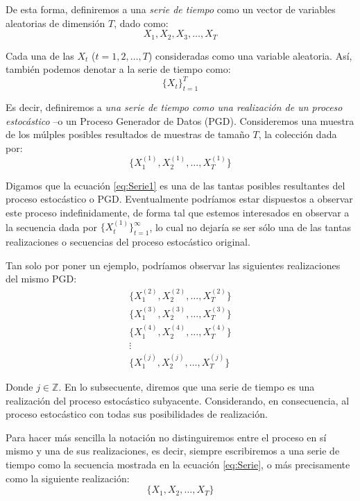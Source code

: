 \documentclass[
]{book}
\begin{document}
De esta forma, definiremos a una \emph{serie de tiempo} como un vector de variables aleatorias de dimensión \(T\), dado como:
\begin{equation}
    X_1, X_2, X_3, \ldots ,X_T
    \label{eq:Serie0}
\end{equation}

Cada una de las \(X_t\) (\(t = 1, 2, \ldots, T\)) consideradas como una variable aleatoria. Así, también podemos denotar a la serie de tiempo como:
\begin{equation}
    \{ X_t \}^T_{t = 1}
    \label{eq:Serie}
\end{equation}

Es decir, definiremos a \emph{una serie de tiempo como una realización de un proceso estocástico} --o un Proceso Generador de Datos (PGD). Consideremos una muestra de los múlples posibles resultados de muestras de tamaño \(T\), la colección dada por:
\begin{equation}
    \{X^{(1)}_1, X^{(1)}_2, \ldots, X^{(1)}_T\}
    \label{eq:Serie1}
\end{equation}

Digamos que la ecuación \eqref{eq:Serie1} es una de las tantas posibles resultantes del proceso estocástico o PGD. Eventualmente podríamos estar dispuestos a observar este proceso indefinidamente, de forma tal que estemos interesados en observar a la secuencia dada por \(\{ X^{(1)}_t \}^{\infty}_{t = 1}\), lo cual no dejaría se ser sólo una de las tantas realizaciones o secuencias del proceso estocástico original.

Tan solo por poner un ejemplo, podríamos observar las siguientes realizaciones del mismo PGD:
\begin{eqnarray*}
    & \{X^{(2)}_1, X^{(2)}_2, \ldots, X^{(2)}_T\} & \\
    & \{X^{(3)}_1, X^{(3)}_2, \ldots, X^{(3)}_T\} & \\
    & \{X^{(4)}_1, X^{(4)}_2, \ldots, X^{(4)}_T\} & \\
    & \vdots & \\
    & \{X^{(j)}_1, X^{(j)}_2, \ldots, X^{(j)}_T\} & 
\end{eqnarray*}

Donde \(j \in \mathbb{Z}\). En lo subsecuente, diremos que una serie de tiempo es una realización del proceso estocástico subyacente. Considerando, en consecuencia, al proceso estocástico con todas sus posibilidades de realización.

Para hacer más sencilla la notación no distinguiremos entre el proceso en sí mismo y una de sus realizaciones, es decir, siempre escribiremos a una serie de tiempo como la secuencia mostrada en la ecuación \eqref{eq:Serie}, o más precisamente como la siguiente realización:
\begin{equation}
    \{ X_1, X_2, \ldots, X_T \}
    \label{eq:Serie2}
\end{equation}
\end{document}
